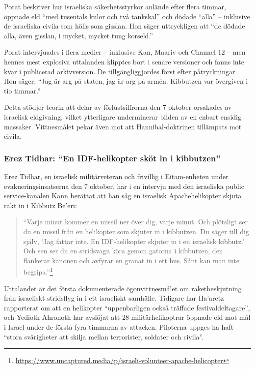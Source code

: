 Porat beskriver hur israeliska säkerhetsstyrkor anlände efter flera timmar, öppnade eld “med tusentals kulor och två tankskal” och dödade “alla” – inklusive de israeliska civila som hölls som gisslan. Hon säger uttryckligen att “de dödade alla, även gisslan, i mycket, mycket tung korseld.”

Porat intervjuades i flera medier – inklusive Kan, Maariv och Channel 12 – men hennes mest explosiva uttalanden klipptes bort i senare versioner och fanns inte kvar i publicerad arkivversion. De tillgängliggjordes först efter påtryckningar. Hon säger: “Jag är arg på staten, jag är arg på armén. Kibbutzen var övergiven i tio timmar.” 

Detta stödjer teorin att delar av förlustsiffrorna den 7 oktober orsakades av israelisk eldgivning, vilket ytterligare underminerar bilden av en enbart ensidig massaker. Vittnesmålet pekar även mot att Hannibal-doktrinen tillämpats mot civila.

\subsubsection*{Erez Tidhar: “En IDF-helikopter sköt in i kibbutzen”}

Erez Tidhar, en israelisk militärveteran och frivillig i Eitam-enheten under evakueringsinsatserna den 7 oktober, har i en intervju med den israeliska public service-kanalen Kann berättat att han såg en israelisk Apachehelikopter skjuta rakt in i Kibbutz Be’eri:

\begin{quote}
“Varje minut kommer en missil ner över dig, varje minut. Och plötsligt ser du en missil från en helikopter som skjuter in i kibbutzen. Du säger till dig själv, ‘Jag fattar inte. En IDF-helikopter skjuter in i en israelisk kibbutz.’ Och sen ser du en stridsvagn köra genom gatorna i kibbutzen, den flankerar kanonen och avfyrar en granat in i ett hus. Sånt kan man inte begripa.”\footnote{\url{https://www.uncaptured.media/p/israeli-volunteer-apache-helicopter}}
\end{quote}

Uttalandet är det första dokumenterade ögonvittnesmålet om raketbeskjutning från israeliskt stridsflyg in i ett israeliskt samhälle. Tidigare har Ha’aretz rapporterat om att en helikopter “uppenbarligen också träffade festivaldeltagare”, och Yedioth Ahronoth har avslöjat att 28 militärhelikoptrar öppnade eld mot mål i Israel under de första fyra timmarna av attacken. Piloterna uppges ha haft “stora svårigheter att skilja mellan terrorister, soldater och civila”.

